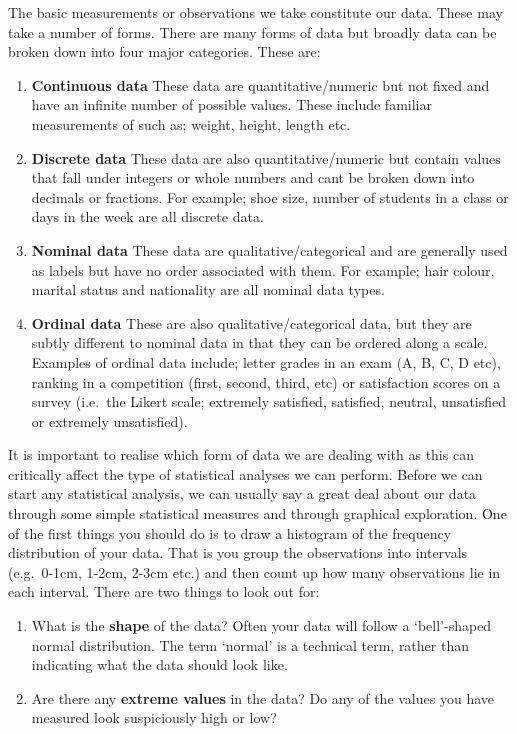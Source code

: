 \documentclass[
]{book}
\begin{document}
The basic measurements or observations we take constitute our data. These may take a number of forms. There are many forms of data but broadly data can be broken down into four major categories.
These are:

\begin{enumerate}
\def\labelenumi{\arabic{enumi})}
\item
  \textbf{Continuous data} These data are quantitative/numeric but not fixed and have an infinite number of possible values. These include familiar measurements of such as; weight, height, length etc.
\item
  \textbf{Discrete data} These data are also quantitative/numeric but contain values that fall under integers or whole numbers and cant be broken down into decimals or fractions. For example; shoe size, number of students in a class or days in the week are all discrete data.
\item
  \textbf{Nominal data} These data are qualitative/categorical and are generally used as labels but have no order associated with them. For example; hair colour, marital status and nationality are all nominal data types.
\item
  \textbf{Ordinal data} These are also qualitative/categorical data, but they are subtly different to nominal data in that they can be ordered along a scale. Examples of ordinal data include; letter grades in an exam (A, B, C, D etc), ranking in a competition (first, second, third, etc) or satisfaction scores on a survey (i.e.~the Likert scale; extremely satisfied, satisfied, neutral, unsatisfied or extremely unsatisfied).
\end{enumerate}

It is important to realise which form of data we are dealing with as this can critically affect the type of statistical analyses we can perform.
Before we can start any statistical analysis, we can usually say a great deal about our data through some simple statistical measures and through graphical exploration. One of the first things you should do is to draw a histogram of the frequency distribution of your data. That is you group the observations into intervals (e.g.~0-1cm, 1-2cm, 2-3cm etc.) and then count up how many observations lie in each interval.
There are two things to look out for:

\begin{enumerate}
\def\labelenumi{\arabic{enumi})}
\item
  What is the \textbf{shape} of the data? Often your data will follow a `bell'-shaped normal distribution. The term `normal' is a technical term, rather than indicating what the data should look like.
\item
  Are there any \textbf{extreme values} in the data? Do any of the values you have measured look suspiciously high or low?
\end{enumerate}
\end{document}
